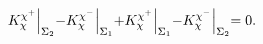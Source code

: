 \begin{equation} K_{\chi}^{\chi^{+}}
\Bigl|_{\Sigma_{2}} -K_{\chi}^{\chi^{-}}
\Bigl|_{\Sigma_{1}}+K_{\chi}^{\chi^{+}} \Bigl|_{\Sigma_{1}}-
K_{\chi}^{\chi^{-}} \Bigl|_{\Sigma_{2}}=0.
\end{equation}

